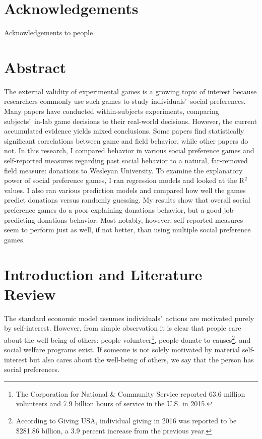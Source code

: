 \documentclass[12pt]{article}
\begin{document}


\newpage
\singlespacing
\tableofcontents
\thispagestyle{empty}


\newpage

\clearpage
{} 
\section*{Acknowledgements}
Acknowledgements to people


\newpage

\section*{Abstract}

\doublespacing
The external validity of experimental games is a growing topic of interest because researchers commonly use such games to study individuals\rq \ social preferences. Many papers have conducted within-subjects experiments, comparing subjects\rq \ in-lab game decisions to their real-world decisions. However, the current accumulated evidence yields mixed conclusions. Some papers find statistically significant correlations between game and field behavior, while other papers do not. In this research, I compared behavior in various social preference games and self-reported measures regarding past social behavior to a natural, far-removed field measure: donations to Wesleyan University. To examine the explanatory power of social preference games, I ran regression models and looked at the R$^{2}$ values. I also ran various prediction models and compared how well the games predict donations versus randomly guessing. My results show that overall social preference games do a poor explaining donations behavior, but a good job predicting donations behavior. Most notably, however, self-reported measures seem to perform just as well, if not better, than using multiple social preference games. 



\newpage


\doublespacing
\section{Introduction and Literature Review}

The standard economic model assumes individuals\rq \ actions are motivated purely by self-interest. However, from simple observation it is clear that people care about the well-being of others: people volunteer\footnote{The Corporation for National \& Community Service reported 63.6 million volunteers and 7.9 billion hours of service in the U.S. in 2015.}, people donate to causes\footnote{According to Giving USA, individual giving in 2016 was reported to be \$281.86 billion, a 3.9 percent increase from the previous year.}, and social welfare programs exist. If someone is not solely motivated by material self-interest but also cares about the well-being of others, we say that the person has social preferences. 
\end{document}
